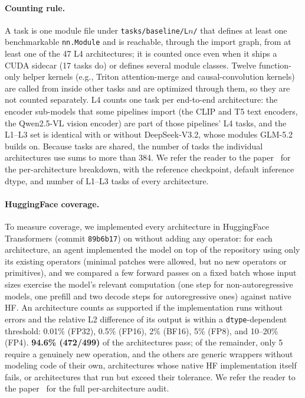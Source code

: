 \paragraph{Counting rule.}
A task is one module file under \texttt{tasks/baseline/L$n$/} that defines at least one benchmarkable \texttt{nn.Module} and is reachable, through the import graph, from at least one of the 47 L4 architectures; it is counted once even when it ships a CUDA sidecar (17 tasks do) or defines several module classes.
Twelve function-only helper kernels (e.g., Triton attention-merge and causal-convolution kernels) are called from inside other tasks and are optimized through them, so they are not counted separately.
L4 counts one task per end-to-end architecture: the encoder sub-models that some pipelines import (the CLIP and T5 text encoders, the Qwen2.5-VL vision encoder) are part of those pipelines' L4 tasks, and the L1--L3 set is identical with or without DeepSeek-V3.2, whose modules GLM-5.2 builds on.
Because tasks are shared, the number of tasks the individual architectures use sums to more than 384.
We refer the reader to the \FastKernels paper~\cite{fastkernels} for the per-architecture breakdown, with the reference checkpoint, default inference dtype, and number of L1--L3 tasks of every architecture.

\paragraph{HuggingFace coverage.}
To measure coverage, we implemented every architecture in HuggingFace Transformers (commit \texttt{89b6b17}) on \FastKernels without adding any operator: for each architecture, an agent implemented the model on top of the \FastKernels repository using only its existing operators (minimal patches were allowed, but no new operators or primitives), and we compared a few forward passes on a fixed batch whose input sizes exercise the model's relevant computation (one step for non-autoregressive models, one prefill and two decode steps for autoregressive ones) against native HF.
An architecture counts as supported if the implementation runs without errors and the relative L2 difference of its output is within a \texttt{dtype}-dependent threshold: 0.01\% (FP32), 0.5\% (FP16), 2\% (BF16), 5\% (FP8), and 10--20\% (FP4).
\textbf{94.6\% (472/499)} of the architectures pass; of the remainder, only 5 require a genuinely new operation, and the others are generic wrappers without modeling code of their own, architectures whose native HF implementation itself fails, or architectures that run but exceed their tolerance.
We refer the reader to the \FastKernels paper~\cite{fastkernels} for the full per-architecture audit.

